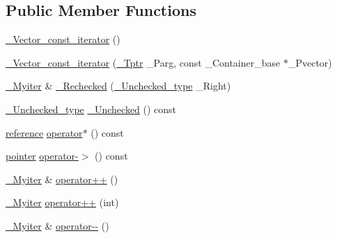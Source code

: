 \subsection*{Public Member Functions}
\begin{DoxyCompactItemize}
\item 
\hyperlink{class___vector__const__iterator_abe1aa8a2e93616a96b68fba5d20840c0}{\+\_\+\+Vector\+\_\+const\+\_\+iterator} ()
\item 
\hyperlink{class___vector__const__iterator_ae032c3d3a887e78738ff28dfaeeafc09}{\+\_\+\+Vector\+\_\+const\+\_\+iterator} (\hyperlink{class___vector__const__iterator_a9b6960b4fe0656e2e83c54e6c7757a15}{\+\_\+\+Tptr} \+\_\+\+Parg, const \+\_\+\+Container\+\_\+base $\ast$\+\_\+\+Pvector)
\item 
\hyperlink{class___vector__const__iterator_ac41cce1a95dfa665c2d7237fd94d776b}{\+\_\+\+Myiter} \& \hyperlink{class___vector__const__iterator_a1efb4c8566f4ed31eb665c65cc74d1dc}{\+\_\+\+Rechecked} (\hyperlink{class___vector__const__iterator_a17897ed20e5a6c25f9b383d0f0a4bb9d}{\+\_\+\+Unchecked\+\_\+type} \+\_\+\+Right)
\item 
\hyperlink{class___vector__const__iterator_a17897ed20e5a6c25f9b383d0f0a4bb9d}{\+\_\+\+Unchecked\+\_\+type} \hyperlink{class___vector__const__iterator_a0f1bb188a364ea983f766cd7cb08a1d8}{\+\_\+\+Unchecked} () const 
\item 
\hyperlink{class___vector__const__iterator_ad622d2f855c02a5b3b2f49f39cbbabf4}{reference} \hyperlink{class___vector__const__iterator_aff78225a996909556ae7836840592bec}{operator$\ast$} () const 
\item 
\hyperlink{class___vector__const__iterator_a301a1187c227c820bd86335496229e6a}{pointer} \hyperlink{class___vector__const__iterator_aff1b4b3863ccd8d605288acd0bdab017}{operator-\/$>$} () const 
\item 
\hyperlink{class___vector__const__iterator_ac41cce1a95dfa665c2d7237fd94d776b}{\+\_\+\+Myiter} \& \hyperlink{class___vector__const__iterator_af06aa214fc08cfe0a52f1cade5e11297}{operator++} ()
\item 
\hyperlink{class___vector__const__iterator_ac41cce1a95dfa665c2d7237fd94d776b}{\+\_\+\+Myiter} \hyperlink{class___vector__const__iterator_ab85d07f8d450f7a039f3718e2fa40085}{operator++} (int)
\item 
\hyperlink{class___vector__const__iterator_ac41cce1a95dfa665c2d7237fd94d776b}{\+\_\+\+Myiter} \& \hyperlink{class___vector__const__iterator_a308a1e2758c025af89d9827611991f75}{operator-\/-\/} ()
\item 

\end{DoxyCompactItemize}

